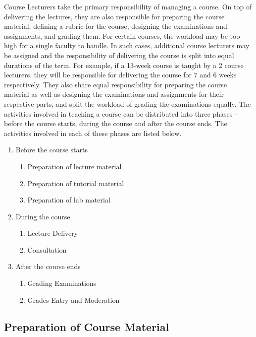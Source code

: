 Course Lecturers take the primary responsibility of managing a course. On top of delivering the lectures, they are also responsible for preparing the course material, defining a rubric for the course, designing the examinations and assignments, and grading them. For certain courses, the workload may be too high for a single faculty to handle. In such cases, additional course lecturers may be assigned and the responsibility of delivering the course is split into equal durations of the term. For example, if a 13-week course is taught by a 2 course lecturers, they will be responsible for delivering the course for 7 and 6 weeks respectively. They also share equal responsibility for preparing the course material as well as designing the examinations and assignments for their respective parts, and split the workload of grading the examinations equally. The activities involved in teaching a course can be distributed into three phases - before the course starts, during the course and after the course ends. The activities involved in each of these phases are listed below.

\begin{enumerate}
  \item Before the course starts
        \begin{enumerate}
          \item Preparation of lecture material
          \item Preparation of tutorial material
          \item Preparation of lab material
        \end{enumerate}

  \item During the course
        \begin{enumerate}
          \item Lecture Delivery
          \item Consultation
        \end{enumerate}

  \item After the course ends
        \begin{enumerate}
          \item Grading Examinations
          \item Grades Entry and Moderation
        \end{enumerate}
\end{enumerate}

\subsection{Preparation of Course Material}
\label{sec:preparation_of_course_material}

